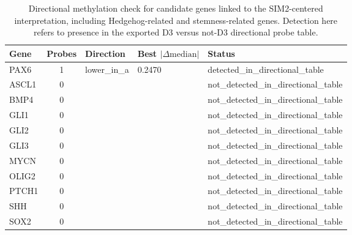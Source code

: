\begin{table}[htbp]
\centering
\caption{Directional methylation check for candidate genes linked to the SIM2-centered interpretation, including Hedgehog-related and stemness-related genes. Detection here refers to presence in the exported D3 versus not-D3 directional probe table.}
\label{tab:sim2_candidate_directional_check}
\begin{tabular}{lclll}
\hline
Gene & Probes & Direction & Best $|\Delta \mathrm{median}|$ & Status \\
\hline
PAX6 & 1 & lower\_in\_a & 0.2470 & detected\_in\_directional\_table \\
ASCL1 & 0 &  &  & not\_detected\_in\_directional\_table \\
BMP4 & 0 &  &  & not\_detected\_in\_directional\_table \\
GLI1 & 0 &  &  & not\_detected\_in\_directional\_table \\
GLI2 & 0 &  &  & not\_detected\_in\_directional\_table \\
GLI3 & 0 &  &  & not\_detected\_in\_directional\_table \\
MYCN & 0 &  &  & not\_detected\_in\_directional\_table \\
OLIG2 & 0 &  &  & not\_detected\_in\_directional\_table \\
PTCH1 & 0 &  &  & not\_detected\_in\_directional\_table \\
SHH & 0 &  &  & not\_detected\_in\_directional\_table \\
SOX2 & 0 &  &  & not\_detected\_in\_directional\_table \\
\hline
\end{tabular}
\end{table}
